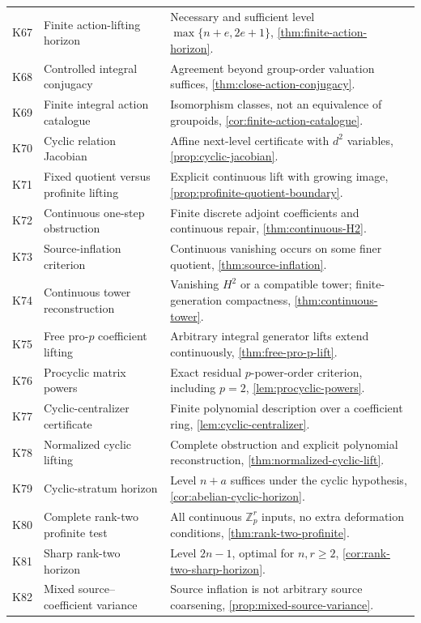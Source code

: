 \documentclass[11pt]{article}
\theoremstyle{definition}
\theoremstyle{remark}
\begin{document}
\begin{longtable}{>{\raggedright\arraybackslash}p{} >{\raggedright\arraybackslash}p{} >{\raggedright\arraybackslash}p{}}
K67 & Finite action-lifting horizon & Necessary and sufficient level $\max\{n+e,2e+1\}$, \cref{thm:finite-action-horizon}.\\
K68 & Controlled integral conjugacy & Agreement beyond group-order valuation suffices, \cref{thm:close-action-conjugacy}.\\
K69 & Finite integral action catalogue & Isomorphism classes, not an equivalence of groupoids, \cref{cor:finite-action-catalogue}.\\
K70 & Cyclic relation Jacobian & Affine next-level certificate with $d^2$ variables, \cref{prop:cyclic-jacobian}.\\
K71 & Fixed quotient versus profinite lifting & Explicit continuous lift with growing image, \cref{prop:profinite-quotient-boundary}.\\
K72 & Continuous one-step obstruction & Finite discrete adjoint coefficients and continuous repair, \cref{thm:continuous-H2}.\\
K73 & Source-inflation criterion & Continuous vanishing occurs on some finer quotient, \cref{thm:source-inflation}.\\
K74 & Continuous tower reconstruction & Vanishing $H^2$ or a compatible tower; finite-generation compactness, \cref{thm:continuous-tower}.\\
K75 & Free pro-$p$ coefficient lifting & Arbitrary integral generator lifts extend continuously, \cref{thm:free-pro-p-lift}.\\
K76 & Procyclic matrix powers & Exact residual $p$-power-order criterion, including $p=2$, \cref{lem:procyclic-powers}.\\
K77 & Cyclic-centralizer certificate & Finite polynomial description over a coefficient ring, \cref{lem:cyclic-centralizer}.\\
K78 & Normalized cyclic lifting & Complete obstruction and explicit polynomial reconstruction, \cref{thm:normalized-cyclic-lift}.\\
K79 & Cyclic-stratum horizon & Level $n+a$ suffices under the cyclic hypothesis, \cref{cor:abelian-cyclic-horizon}.\\
K80 & Complete rank-two profinite test & All continuous $\mathbb Z_p^r$ inputs, no extra deformation conditions, \cref{thm:rank-two-profinite}.\\
K81 & Sharp rank-two horizon & Level $2n-1$, optimal for $n,r\geq2$, \cref{cor:rank-two-sharp-horizon}.\\
K82 & Mixed source--coefficient variance & Source inflation is not arbitrary source coarsening, \cref{prop:mixed-source-variance}.\\
\bottomrule
\end{longtable}
\end{document}
